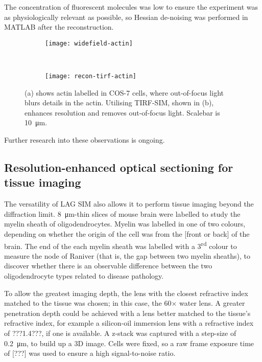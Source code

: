 The concentration of fluorescent molecules was low to ensure the experiment was as physiologically relevant as possible, so Hessian de-noising was performed in MATLAB after the reconstruction. 

\begin{figure}[tbp!]
\centering
\begin{subfigure}[b]{0.7\textwidth}
	\texttt{[image: widefield-actin]}
	\caption{}\label{fig:widefield-actin}
\end{subfigure}

~\newline
\begin{subfigure}[b]{0.7\textwidth}
	\texttt{[image: recon-tirf-actin]}
	\caption{}\label{fig:recon-tirf-actin}
\end{subfigure}
\caption[LAG SIM: TIRF imaging of actin in COS-7 cells removes out-of-focus light]{(a) shows actin labelled in COS-7 cells, where out-of-focus light blurs details in the actin. Utilising TIRF-SIM, shown in (b), enhances resolution and removes out-of-focus light. Scalebar is \SI{10}{\micro\metre}. }
\label{fig:recon-actin}
\end{figure}

Further research into these observations is ongoing. 


\subsection{Resolution-enhanced optical sectioning for tissue imaging}
The versatility of LAG SIM also allows it to perform tissue imaging beyond the diffraction limit. 
\SI{8}{\micro\metre}-thin slices of mouse brain were labelled to study the myelin sheath of oligodendrocytes. 
Myelin was labelled in one of two colours, depending on whether the origin of the cell was from the [front or back] of the brain. 
The end of the each myelin sheath was labelled with a 3\textsuperscript{rd} colour to measure the node of Raniver (that is, the gap between two myelin sheaths), to discover whether there is an observable difference between the two oligodendrocyte types related to disease pathology. 

To allow the greatest imaging depth, the lens with the closest refractive index matched to the tissue was chosen; in this case, the 60$\times$ water lens. 
A greater penetration depth could be achieved with a lens better matched to the tissue's refractive index, for example a silicon-oil immersion lens with a refractive index of ???1.4???, if one is available. 
A z-stack was captured with a step-size of \SI{0.2}{\micro\metre}, to build up a 3D image. 
Cells were fixed, so a raw frame exposure time of [???] was used to ensure a high signal-to-noise ratio. 

